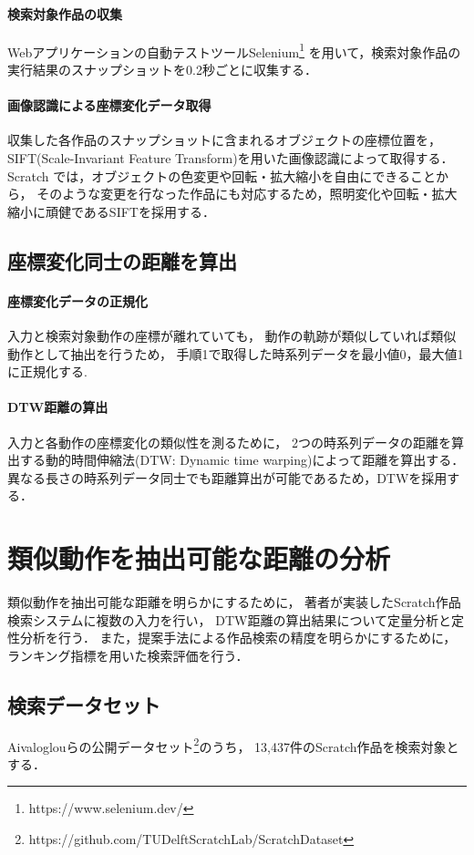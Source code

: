 \documentclass[twocolumn]{jarticle} %
\begin{document}
\paragraph{検索対象作品の収集}
Webアプリケーションの自動テストツールSelenium\footnote{https://www.selenium.dev/}
を用いて，検索対象作品の実行結果のスナップショットを0.2秒ごとに収集する．
\paragraph{画像認識による座標変化データ取得}
収集した各作品のスナップショットに含まれるオブジェクトの座標位置を，
SIFT(Scale-Invariant Feature Transform)\cite{sift}を用いた画像認識によって取得する．
Scratch では，オブジェクトの色変更や回転・拡大縮小を自由にできることから，
そのような変更を行なった作品にも対応するため，照明変化や回転・拡大縮小に頑健であるSIFTを採用する．

\subsection{座標変化同士の距離を算出}
\paragraph{座標変化データの正規化}
入力と検索対象動作の座標が離れていても，
動作の軌跡が類似していれば類似動作として抽出を行うため，
手順1で取得した時系列データを最小値0，最大値1に正規化する.

\paragraph{DTW距離の算出}
入力と各動作の座標変化の類似性を測るために，
2つの時系列データの距離を算出する動的時間伸縮法(DTW: Dynamic time warping)によって距離を算出する．
異なる長さの時系列データ同士でも距離算出が可能であるため，DTWを採用する．

\section{類似動作を抽出可能な距離の分析}\label{chap:fig-tab-exp}
類似動作を抽出可能な距離を明らかにするために，
著者が実装したScratch作品検索システムに複数の入力を行い，
DTW距離の算出結果について定量分析と定性分析を行う．
また，提案手法による作品検索の精度を明らかにするために，
ランキング指標を用いた検索評価を行う．

\subsection{検索データセット}
Aivaloglouらの公開データセット\footnote{https://github.com/TUDelftScratchLab/ScratchDataset}のうち，
13,437件のScratch作品を検索対象とする．
\end{document}

